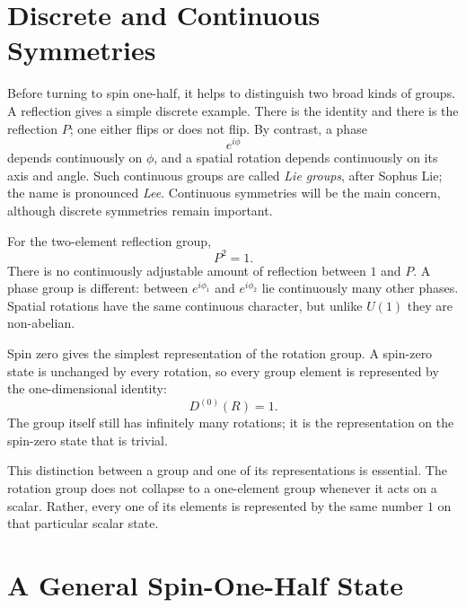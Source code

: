 \section{Discrete and Continuous Symmetries}

Before turning to spin one-half, it helps to distinguish two broad kinds of
groups. A reflection gives a simple discrete example. There is the identity
and there is the reflection \(P\); one either flips or does not flip. By
contrast, a phase
\begin{equation}
e^{i\phi}
\end{equation}
depends continuously on \(\phi\), and a spatial rotation depends continuously
on its axis and angle. Such continuous groups are called \emph{Lie groups},
after Sophus Lie; the name is pronounced \emph{Lee}. Continuous symmetries will
be the main concern, although discrete symmetries remain important.

For the two-element reflection group,
\begin{equation}
P^2=1.
\end{equation}
There is no continuously adjustable amount of reflection between \(1\) and
\(P\). A phase group is different: between \(e^{i\phi_1}\) and
\(e^{i\phi_2}\) lie continuously many other phases. Spatial rotations have
the same continuous character, but unlike \(U(1)\) they are non-abelian.

Spin zero gives the simplest representation of the rotation group. A spin-zero
state is unchanged by every rotation, so every group element is represented
by the one-dimensional identity:
\begin{equation}
D^{(0)}(R)=1.
\end{equation}
The group itself still has infinitely many rotations; it is the
representation on the spin-zero state that is trivial.

This distinction between a group and one of its representations is essential.
The rotation group does not collapse to a one-element group whenever it acts
on a scalar. Rather, every one of its elements is represented by the same
number \(1\) on that particular scalar state.

\section{A General Spin-One-Half State}

